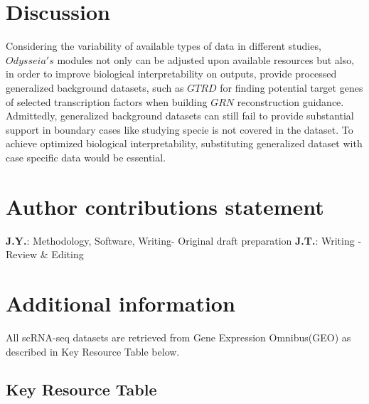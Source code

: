 \documentclass[fleqn,10pt]{wlscirep}
\begin{document}
\section*{Discussion}
\label{disc}
Considering the variability of available types of data in different studies, $Odysseia's$ modules not only can be adjusted upon available resources but also, in order to improve biological interpretability on outputs, provide processed generalized background datasets, such as $GTRD$\cite{gkaa1057} for finding potential target genes of selected transcription factors when building $GRN$ reconstruction guidance. Admittedly, generalized background datasets can still fail to provide substantial support in boundary cases like studying specie is not covered in the dataset. To achieve optimized biological interpretability, substituting generalized dataset with case specific data would be essential.







\section*{Author contributions statement}
\textbf{J.Y.}: Methodology, Software, Writing- Original draft preparation
\textbf{J.T.}: Writing - Review \& Editing

\section*{Additional information}
All scRNA-seq datasets are retrieved from Gene Expression Omnibus(GEO) as described in Key Resource Table below.


\subsection*{Key Resource Table}
\end{document}
